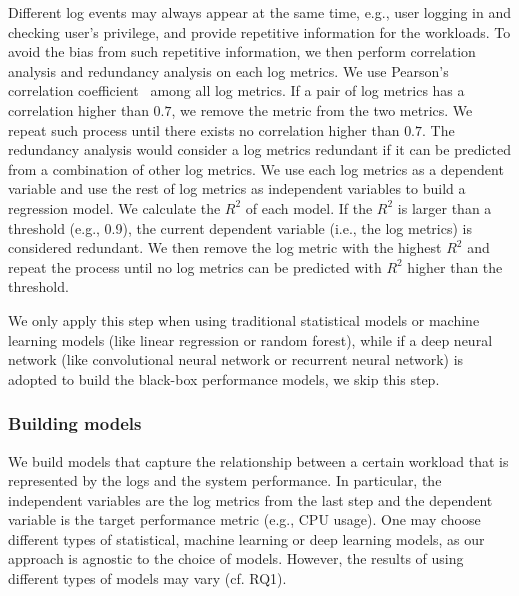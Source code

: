 Different log events may always appear at the same time, e.g., user logging in and checking user's privilege, and provide repetitive information for the workloads. To avoid the bias from such repetitive information, we then perform correlation analysis and redundancy analysis on each log metrics. We use Pearson's correlation coefficient~\citep{benesty2009pearson} among all log metrics. If a pair of log metrics has a correlation higher than $0.7$, we remove the metric from the two metrics. We repeat such process until there exists no correlation higher than $0.7$. The redundancy analysis would consider a log metrics redundant if it can be predicted from a combination of other log metrics. We use each log metrics as a dependent variable and use the rest of log metrics as independent variables to build a regression model. We calculate the $R^2$ of each model. If the $R^2$ is larger than a threshold (e.g., 0.9), the current dependent variable (i.e., the log metrics) is considered redundant. We then remove the log metric with the highest $R^2$ and repeat the process until no log metrics can be predicted with $R^2$ higher than the threshold. 

We only apply this step when using traditional statistical models or machine learning models (like linear regression or random forest), while if a deep neural network (like convolutional neural network or recurrent neural network) is adopted to build the black-box performance models, we skip this step.


\subsubsection{Building models}
We build models that capture the relationship between a certain workload that is represented by the logs and the system performance. In particular, the independent variables are the log metrics from the last step and the dependent variable is the target performance metric (e.g., CPU usage). One may choose different types of statistical, machine learning or deep learning models, as our approach is agnostic to the choice of models. However, the results of using different types of models may vary (cf. RQ1). 



